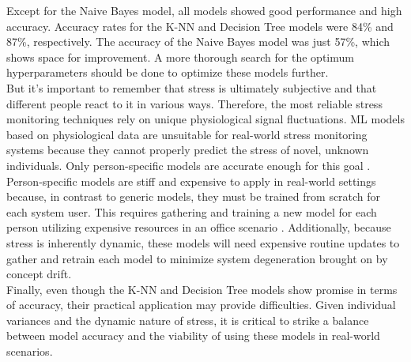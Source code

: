 \documentclass{article}
\begin{document}
Except for the Naive Bayes model, all models showed good performance and high accuracy. Accuracy rates for the K-NN and Decision Tree models were 84\% and 87\%, respectively. The accuracy of the Naive Bayes model was just 57\%, which shows space for improvement. A more thorough search for the optimum hyperparameters should be done to optimize these models further. \\
But it's important to remember that stress is ultimately subjective and that different people react to it in various ways. Therefore, the most reliable stress monitoring techniques rely on unique physiological signal fluctuations. ML models based on physiological data are unsuitable for real-world stress monitoring systems because they cannot properly predict the stress of novel, unknown individuals. Only person-specific models are accurate enough for this goal \cite{ravi2021}.  Person-specific models are stiff and expensive to apply in real-world settings because, in contrast to generic models, they must be trained from scratch for each system user. This requires gathering and training a new model for each person utilizing expensive resources in an office scenario \cite{ravi2021}. Additionally, because stress is inherently dynamic, these models will need expensive routine updates to gather and retrain each model to minimize system degeneration brought on by concept drift. \\

Finally, even though the K-NN and Decision Tree models show promise in terms of accuracy, their practical application may provide difficulties. Given individual variances and the dynamic nature of stress, it is critical to strike a balance between model accuracy and the viability of using these models in real-world scenarios.



\end{document}
